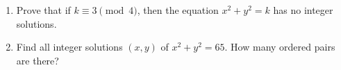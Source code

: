 \begin{enumerate}
\item[(a)] Prove that if $k\equiv3\pmod4$, then the equation $x^2+y^2=k$ has no integer solutions.
\item[(b)] Find all integer solutions $(x,y)$ of $x^2+y^2=65$. How many ordered pairs are there?
\end{enumerate}
